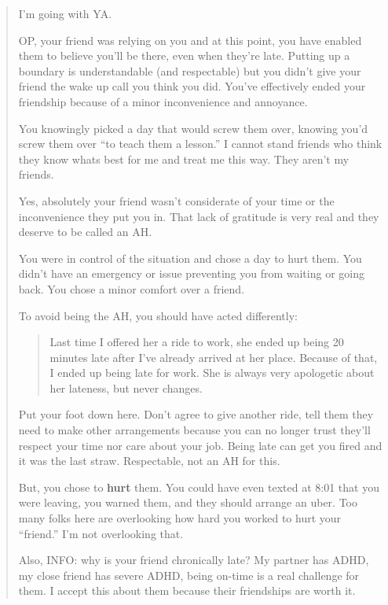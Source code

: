 \begin{quote}
I'm going with YA.

OP, your friend was relying on you and at this point, you have enabled
them to believe you'll be there, even when they're late. Putting up a
boundary is understandable (and respectable) but you didn't give your
friend the wake up call you think you did. You've effectively ended
your friendship because of a minor inconvenience and annoyance.

You knowingly picked a day that would screw them over, knowing you'd
screw them over ``to teach them a lesson.'' I cannot stand friends who
think they know whats best for me and treat me this way. They aren't my
friends.

Yes, absolutely your friend wasn't considerate of your time or the
inconvenience they put you in. That lack of gratitude is very real and
they deserve to be called an AH.

You were in control of the situation and chose a day to hurt them. You
didn't have an emergency or issue preventing you from waiting or going
back. You chose a minor comfort over a friend.

To avoid being the AH, you should have acted differently:

\begin{quote}
Last time I offered her a ride to work, she ended up being 20 minutes
late after I've already arrived at her place. Because of that, I ended
up being late for work. She is always very apologetic about her
lateness, but never changes.
\end{quote}

Put your foot down here. Don't agree to give another ride, tell them
they need to make other arrangements because you can no longer trust
they'll respect your time nor care about your job. Being late can get
you fired and it was the last straw. Respectable, not an AH for this.

But, you chose to \textbf{hurt} them. You could have even texted at
8:01 that you were leaving, you warned them, and they should arrange an
uber. Too many folks here are overlooking how hard you worked to hurt
your ``friend.'' I'm not overlooking that.

Also, INFO: why is your friend chronically late? My partner has ADHD,
my close friend has severe ADHD, being on-time is a real challenge for
them. I accept this about them because their friendships are worth it.
\end{quote}


